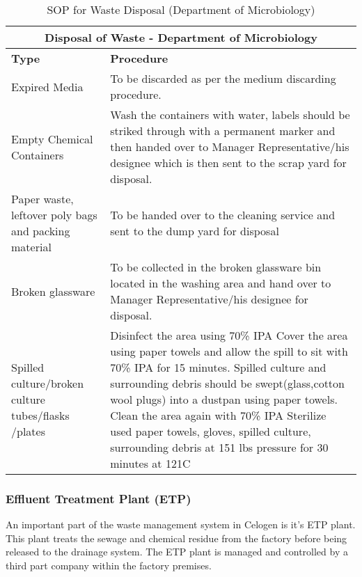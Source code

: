 \documentclass[a4paper,12pt]{article}
\begin{document}
					\begin{table}[H]
						\centering
						\def\arraystretch{1.5}
						\begin{tabular}{p{3 in}p{3 in}}
							\hline
							\multicolumn{2}{c}{{\bf Disposal of Waste - Department of Microbiology}}													\\
							\hline
							{\bf Type} 					& {\bf Procedure} 	\\
							\hline 				
							Expired Media				& To be discarded as per the medium discarding procedure.									\\
							\hline
							Empty Chemical Containers 	& Wash the containers with water, labels should be striked through with a permanent marker and then handed over to Manager Representative/his designee which is then sent to the scrap yard for disposal. 																			\\ 	
							\hline
							Paper waste, leftover poly bags and packing material
				 							& To be handed over to the cleaning service and sent to the  dump yard for disposal 		\\
							\hline					
							Broken glassware			& To be collected in the broken glassware bin located in the washing area and hand over to Manager Representative/his designee for disposal.						\\
							\hline
							Spilled culture/broken culture tubes/flasks /plates & Disinfect the area using 70\% IPA
							Cover the area using paper towels and allow the spill to sit with 70\% IPA for 15 minutes. 
							Spilled culture and surrounding debris should be swept(glass,cotton wool plugs) into a dustpan using paper towels.
							Clean the area again with 70\% IPA
							Sterilize used paper towels, gloves, spilled culture, surrounding debris at 151 lbs pressure for 30 minutes at 121\degree C \\
				
			\end{tabular}
			\caption{SOP for Waste Disposal (Department of Microbiology)}
			\label{tab:SOP for Waste Disposal (Department of Microbiology)}
			\end{table}
			
			\newpage
			\subsubsection*{Effluent Treatment Plant (ETP)}
				
				An important part of the waste management system in Celogen is it's ETP plant.
				This plant treats the sewage and chemical residue from the factory before being released to the drainage system.
				The ETP plant is managed and controlled by a third part company within the factory premises.
								
\end{document}
